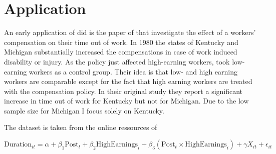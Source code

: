 \section{Application}

An early application of \ac{did} is the paper of \citet{meyer1990workers} that investigate the effect of a workers' compensation on their time out of work.
In 1980 the states of Kentucky and Michigan substantially increased the compensations in case of work induced disability or injury.
As the policy just affected high-earning workers, \citet{meyer1990workers} took low-earning workers as a control group.
Their idea is that low- and high earning workers are comparable except for the fact that high earning workers are treated with the compensation policy.
In their original study they report a significant increase in time out of work for Kentucky but not for Michigan.
Due to the low sample size for Michigan I focus solely on Kentucky.




The dataset is taken from the online ressources of \citet{wooldridge2019introductory}



\begin{equation}
\text{Duration}_{it} = \alpha + \beta_1 \text{Post}_t + \beta_2 \text{HighEarnings}_i + \beta_3 (\text{Post}_t \times \text{HighEarnings}_i) + \gamma X_{it} + \epsilon_{it}
\end{equation}
